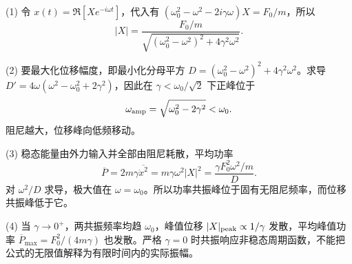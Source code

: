 (1) 令 \(x(t)=\Re[Xe^{-i\omega t}]\)，代入有 \((\omega_0^2-\omega^2-2i\gamma\omega)X=F_0/m\)，所以
\[
|X|=\frac{F_0/m}{\sqrt{(\omega_0^2-\omega^2)^2+4\gamma^2\omega^2}}.
\]

(2) 要最大化位移幅度，即最小化分母平方 \(D=(\omega_0^2-\omega^2)^2+4\gamma^2\omega^2\)。求导 \(D'=4\omega(\omega^2-\omega_0^2+2\gamma^2)\)，因此在 \(\gamma<\omega_0/\sqrt2\) 下正峰位于
\[
\omega_{\rm amp}=\sqrt{\omega_0^2-2\gamma^2}<\omega_0.
\]
阻尼越大，位移峰向低频移动。

(3) 稳态能量由外力输入并全部由阻尼耗散，平均功率
\[
\overline P=2m\gamma\overline{\dot x^2}
=m\gamma\omega^2|X|^2
=\frac{\gamma F_0^2\omega^2/m}{D}.
\]
对 \(\omega^2/D\) 求导，极大值在 \(\omega=\omega_0\)。所以功率共振峰位于固有无阻尼频率，而位移共振峰低于它。

(4) 当 \(\gamma\to0^+\)，两共振频率均趋 \(\omega_0\)，峰值位移 \(|X|_{\rm peak}\propto1/\gamma\) 发散，平均峰值功率 \(\overline P_{\max}=F_0^2/(4m\gamma)\) 也发散。严格 \(\gamma=0\) 时共振响应非稳态周期函数，不能把公式的无限值解释为有限时间内的实际振幅。
